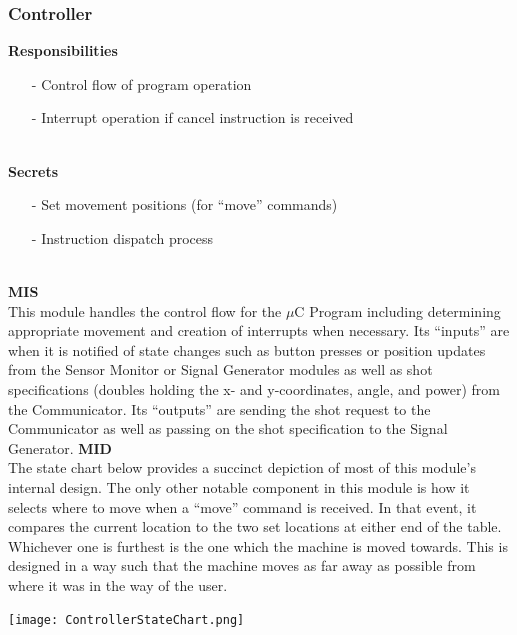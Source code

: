 \documentclass[titlepage]{article}
\begin{document}
\subsubsection{Controller}
\textbf{Responsibilities}
\begin{itemize}
	\item[-] Control flow of program operation
	\item[-] Interrupt operation if cancel instruction is received
\end{itemize}~\\
\textbf{Secrets}
\begin{itemize}
	\item[-] Set movement positions (for ``move'' commands)
	\item[-] Instruction dispatch process
\end{itemize}~\\
\textbf{MIS}\\[2mm]
This module handles the control flow for the $\mu$C Program including determining appropriate movement and creation of interrupts when necessary. Its ``inputs'' are when it is notified of state changes such as button presses or position updates from the Sensor Monitor or Signal Generator modules as well as shot specifications (doubles holding the x- and y-coordinates, angle, and power) from the Communicator. Its ``outputs'' are sending the shot request to the Communicator as well as passing on the shot specification to the Signal Generator.
\newpage
\textbf{MID}\\[2mm]
The state chart below provides a succinct depiction of most of this module's internal design. The only other notable component in this module is how it selects where to move when a ``move'' command is received. In that event, it compares the current location to the two set locations at either end of the table. Whichever one is furthest is the one which the machine is moved towards. This is designed in a way such that the machine moves as far away as possible from where it was in the way of the user.~\\
\begin{center}
	\texttt{[image: ControllerStateChart.png]}
\label{fig:ControllerStateChart}
\end{center}~\\
\end{document}
